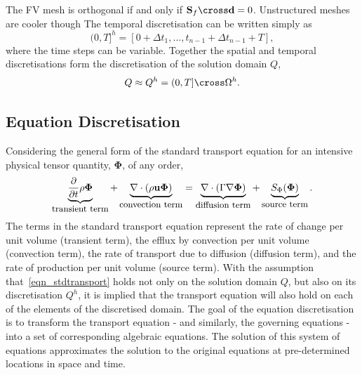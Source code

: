 The FV mesh is orthogonal if and only if $\mathbf{S}_{f} \cross \mathbf{d} = 0$. Unstructured meshes are cooler though 
The temporal discretisation can be written simply as 
\begin{equation}\label{def_tempdiscretisation}
    (0, T]^{h} = \left[0+\Delta t_{1},\dots,t_{n-1} + \Delta t_{n-1} + T \right],
\end{equation}
where the time steps can be variable.
Together the spatial and temporal discretisations form the discretisation of the solution domain $Q$,
\begin{equation}\label{def_solnspacediscretisation}
    Q \approx Q^{h} = (0,T] \cross \Omega^{h}.
\end{equation}
\subsection{Equation Discretisation}\label{sec_eqndisc}
Considering the general form of the standard transport equation for an intensive physical tensor quantity, $\mathbf{\Phi}$, of any order,
\begin{equation}\label{eqn_stdtransport}
    \underbrace{\frac{\partial}{\partial t} \rho \mathbf{\Phi}}_{\text{\small transient term}} + 
    \underbrace{\nabla \cdot (\rho \mathbf{u} \mathbf{\Phi})}_{\text{\small convection term}} = 
    \underbrace{\nabla \cdot (\Gamma \nabla \mathbf{\Phi})}_{\text{\small diffusion term}} + 
    \underbrace{S_{\Phi}(\mathbf{\Phi})}_{\text{\small source term}}.
\end{equation}
The terms in the standard transport equation represent the rate of change per unit volume (transient term),
the efflux by convection per unit volume (convection term), the rate of transport due to diffusion (diffusion term), and the rate of production per unit volume (source term).
With the assumption that~\ref{eqn_stdtransport} holds not only on the solution domain $Q$, but also on its discretisation $Q^{h}$, it 
is implied that the transport equation will also hold on each of the elements of the discretised domain. The goal of the equation discretisation
is to transform the transport equation - and similarly, the governing equations - into a set of corresponding algebraic equations. The solution of this
system of equations approximates the solution to the original equations at pre-determined locations in space and time.

